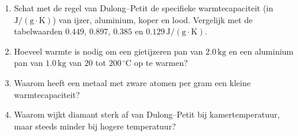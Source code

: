 \begin{oefening}
\begin{enumerate}
\item[(a)]
  Schat met de regel van Dulong--Petit de specifieke warmtecapaciteit (in \(\mathrm{J/(g\cdot K)}\)) van ijzer, aluminium, koper en lood. Vergelijk met de tabelwaarden \(0.449\), \(0.897\), \(0.385\) en \(0.129\,\mathrm{J/(g\cdot K)}\).
\item[(b)]
  Hoeveel warmte is nodig om een gietijzeren pan van \(2.0\,\mathrm{kg}\) en een aluminium pan van \(1.0\,\mathrm{kg}\) van \(20\) tot \(200\,^\circ\mathrm{C}\) op te warmen?
\item[(c)]
  Waarom heeft een metaal met zware atomen per gram een kleine warmtecapaciteit?
\item[(d)]
  Waarom wijkt diamant sterk af van Dulong--Petit bij kamertemperatuur, maar steeds minder bij hogere temperatuur?
\end{enumerate}
\end{oefening}
